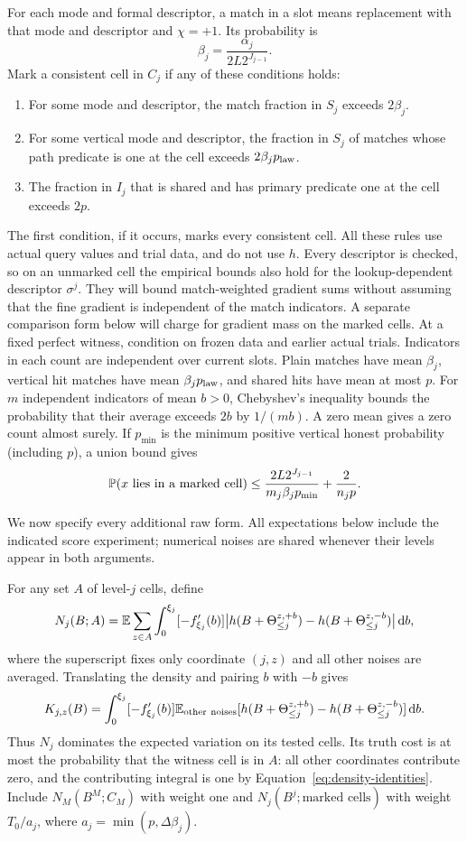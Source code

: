 For each mode and formal descriptor, a match in a slot means replacement
with that mode and descriptor and $\chi=+1$. Its probability is
\[
 \beta_j=\frac{\alpha_j}{2L2^{J_{j-1}}}.
\]
Mark a consistent cell in $C_j$ if any of these conditions holds:
\begin{enumerate}
\item For some mode and descriptor, the match fraction in $S_j$ exceeds
      $2\beta_j$.
\item For some vertical mode and descriptor, the fraction in $S_j$ of
      matches whose path predicate is one at the cell exceeds
      $2\beta_jp_{\rm law}$.
\item The fraction in $I_j$ that is shared and has primary predicate
      one at the cell exceeds $2p$.
\end{enumerate}
The first condition, if it occurs, marks every consistent cell. All
these rules use actual query values and trial data, and do not use $h$.
Every descriptor is checked, so on an unmarked cell the empirical bounds
also hold for the lookup-dependent descriptor $\sigma^j$. They will bound
match-weighted gradient sums without assuming that the fine gradient is
independent of the match indicators. A separate comparison form below
will charge for gradient mass on the marked cells.
At a fixed perfect witness, condition on frozen data and earlier actual
trials. Indicators in each count are independent over current slots.
Plain matches have mean $\beta_j$, vertical hit matches have mean
$\beta_jp_{\rm law}$, and shared hits have mean at most $p$.
For $m$ independent indicators of mean $b>0$, Chebyshev's inequality
bounds the probability that their average exceeds $2b$ by $1/(mb)$.
A zero mean gives a zero count almost surely. If $p_{\min}$ is the
minimum positive vertical honest probability (including $p$), a union
bound gives
\begin{equation}\label{eq:marking-truth}
 \mathbb P(x\text{ lies in a marked cell})
 \le\frac{2L2^{J_{j-1}}}{m_j\beta_jp_{\min}}+\frac2{n_jp}.
\end{equation}

We now specify every additional raw form. All expectations below include
the indicated score experiment; numerical noises are shared whenever
their levels appear in both arguments.

For any set $A$ of level-$j$ cells, define
\[
 N_j(B;A)=\mathbb E\sum_{z\in A}\int_0^{\xi_j}[-f_{\xi_j}'(b)]
 \big|h(B+\Theta_{\le j}^{z,+b})
           -h(B+\Theta_{\le j}^{z,-b})\big|\,\mathrm d b,
\]
where the superscript fixes only coordinate $(j,z)$ and all other noises
are averaged. Translating the density and pairing $b$ with $-b$ gives
\[
 K_{j,z}(B)=\int_0^{\xi_j}[-f_{\xi_j}'(b)]
 \mathbb E_{\rm other\ noises}
 [h(B+\Theta_{\le j}^{z,+b})-h(B+\Theta_{\le j}^{z,-b})]\,\mathrm d b.
\]
Thus $N_j$ dominates the expected variation on its tested cells. Its
truth cost is at most the probability that the witness cell is in $A$:
all other coordinates contribute zero, and the contributing integral
is one by Equation~\ref{eq:density-identities}. Include $N_M(B^M;C_M)$
with weight one and $N_j(B^j;\text{marked cells})$ with weight $T_0/a_j$,
where $a_j=\min(p,\Delta\beta_j)$.

